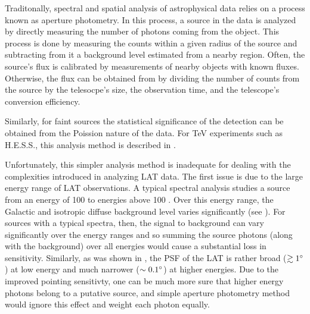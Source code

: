 
Traditonally, spectral and spatial analysis of astrophysical data
relies on a process known as aperture photometry.  In this process,
a source in the data is analyzed by directly measuring the number of
photons coming from the object. This process is done by measuring the
counts within a given radius of the source and subtracting from it a
background level estimated from a nearby region.  Often, the source's
flux is calibrated by measurements of nearby objects with known fluxes.
Otherwise, the flux can be obtained from by dividing the number of
counts from the source by the telesocpe's size, the observation time,
and the telescope's conversion efficiency.

Similarly, for faint sources the statistical significance of the
detection can be obtained from the Poission nature of the data. For
TeV experiments such as H.E.S.S., this analysis method is described in
\cite{background_estimation_li_ma_1983}.

Unfortunately, this simpler analysis method is inadequate for dealing
with the complexities introduced in analyzing LAT data.  The first issue
is due to the large energy range of LAT observations.  A typical spectral
analysis studies a source from an energy of 100 \mev to energies above
100 \gev. Over this energy range, the Galactic and isotropic diffuse
background level varies significantly (see ).
For sources with a typical spectra, then, the signal to background
can vary significantly over the energy ranges and so summing the
source photons (along with the background) over all energies would
cause a substantial loss in sensitivity.  Similarly, as was shown in
, the PSF of the LAT
is rather broad ($\gtrsim 1^\circ$) at low energy and much narrower
($\sim 0.1^\circ$) at higher energies. Due to the improved
pointing sensitivty, one can be much more sure that higher energy
photons belong to a putative source, and simple aperture photometry
method would ignore this effect and weight each photon equally.





